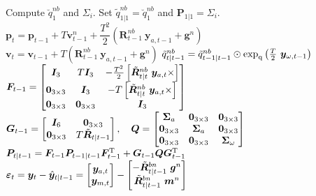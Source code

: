 \begin{algorithm}[H]
	\DontPrintSemicolon \SetAlgoLongEnd \SetAlgoLined 
	 
	Compute $ \breve{q} ^{nb} _{1} $ and $ \Sigma _{i} $. \;
	Set $ \tilde{q} ^{nb} _{1 | 1} = \breve{q} ^{nb} _{1}$ and $ \bm{P} _{1 | 1} = \Sigma _{i} $. \;
	 {   
		$ \bm{p} _{t}   =   \bm{p} _{t-1} + T \bm{v} ^{n} _{t-1}  +  \dfrac {T ^{2}} {2} \left( \bm{R} ^{nb} _{t-1} \ \bm{y} _{a,t-1} + \bm{g} ^{n} \right)  $ \;
		$ \bm{v} _{t}   =   \bm{v} _{t-1} + T \left( \bm{R} ^{nb} _{t-1} \ \bm{y} _{a,t-1} + \bm{g} ^{n} \right) $ \;
		$ \tilde{q} ^{nb} _{t | t-1}   =   \tilde{q} ^{nb} _{t-1 | t-1}   \odot   \exp _\text{q} \left( \tfrac{T}{2} \ \bm{y} _{\omega, t-1} \right) $ \;
		$ \bm{F} _{t-1}   =   \begin{bmatrix}   \bm{I} _{3}   &   T\bm{I} _{3}   &   - \tfrac {T ^{2}} {2} \left[  \tilde{\bm{R}} ^{nb} _{t | t} \ \bm{y} _{a,t} \times \right]   \\   \bm{0} _{3 \times 3}   &   \bm{I} _{3}   &   -T \left[  \tilde{\bm{R}} ^{nb} _{t | t} \ \bm{y} _{a,t} \times \right]   \\   \bm{0} _{3 \times 3}   &   \bm{0} _{3 \times 3}   &   \bm{I} _{3}   \end{bmatrix} $ \;
		$ \bm{G} _{t-1}   =   \begin{bmatrix}   \bm{I} _{6}   &   \bm{0} _{3 \times 3}   \\   \bm{0} _{3 \times 3}   &   T \tilde{\bm{R}} _{t | t-1}   \end{bmatrix} ,    \quad   \bm{Q}   =   \begin{bmatrix}   \bm{\Sigma} _{a}   &   \bm{0} _{3 \times 3}   &   \bm{0} _{3 \times 3}   \\   \bm{0} _{3 \times 3}   &   \bm{\Sigma} _{a}   &   \bm{0} _{3 \times 3}   \\   \bm{0} _{3 \times 3}   &   \bm{0} _{3 \times 3}   &   \bm{\Sigma} _{\omega}   \end{bmatrix} $ \; %
		$ \bm{P} _{t | t-1}   =   \bm{F} _{t-1} \bm{P} _{t-1 | t-1} \bm{F} _{t-1} ^\text{T}   +   \bm{G} _{t-1} \bm{Q} \bm{G} _{t-1} ^\text{T} $   
		$ \bm{\varepsilon} _{t}   =   \bm{y}_{t} - \hat{\bm{y}} _{t | t-1}   =   \begin{bmatrix} \bm{y} _{a,t}  \\  \bm{y} _{m,t} \end{bmatrix}   -   \begin{bmatrix} - \tilde{\bm{R}} ^{bn} _{t | t-1} \ \bm{g} ^{n}  \\  \tilde{\bm{R}} ^{bn} _{t | t-1} \ \bm{m} ^{n} \end{bmatrix}  $ \;
}
\end{algorithm}
